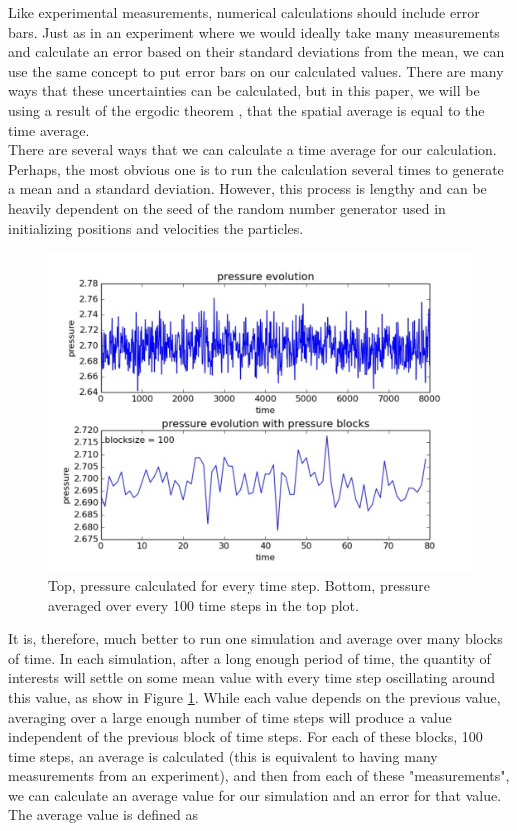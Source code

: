 \documentclass{article}
\begin{document}
\begin{multicols}{2}
Like experimental measurements, numerical calculations should include error bars.  Just as in an experiment where we would ideally take many measurements and calculate an error based on their standard deviations from the mean, we can use the same concept to put error bars on our calculated values.  There are many ways that these uncertainties can be calculated, but in this paper, we will be using a result of the ergodic theorem \cite{Birkhoff}, that the spatial average is equal to the time average.  \\

There are several ways that we can calculate a time average for our calculation.  Perhaps, the most obvious one is to run the calculation several times to generate a mean and a standard deviation.  However, this process is lengthy and can be heavily dependent on the seed of the random number generator used in initializing positions and velocities the particles.  \\

\begin{figure}[H]
\begin{center}
\includegraphics[width=\linewidth]{plots/presn100lp10000T1rho088prt864.pdf}
\caption{Top, pressure calculated for every time step.  Bottom, pressure averaged over every 100 time steps in the top plot.  }
\label{errex}
\end{center}
\end{figure}

It is, therefore, much better to run one simulation and average over many blocks of time.  In each simulation, after a long enough period of time, the quantity of interests will settle on some mean value with every time step oscillating around this value, as show in Figure \ref{errex}.  While each value depends on the previous value, averaging over a large enough number of time steps will produce a value independent of the previous block of time steps.  For each of these blocks, 100 time steps, an average is calculated (this is equivalent to having many measurements from an experiment), and then from each of these "measurements", we can calculate an average value for our simulation and an error for that value.  The average value is defined as 


\end{multicols}
\end{document}
